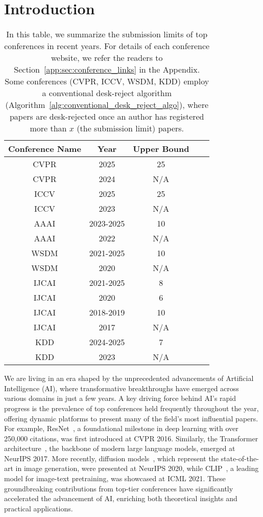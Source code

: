 \section{Introduction}

\begin{table}[!ht]\caption{ 
In this table, we summarize the submission limits of top conferences in recent years. For details of each conference website, we refer the readers to Section~\ref{app:sec:conference_links} in the Appendix. 
Some conferences (CVPR, ICCV, WSDM, KDD) employ a conventional desk-reject algorithm (Algorithm~\ref{alg:conventional_desk_reject_algo}), where papers are desk-rejected once an author has registered more than $x$ (the submission limit) papers.
}  \label{tab:conference_submission_limit}
\begin{center}
\begin{tabular}{ |c|c|c|c|c| } 
 \hline
 {\bf Conference Name} & {\bf Year} & {\bf Upper Bound} \\ \hline
 CVPR & 2025 & 25 \\ \hline
 CVPR & 2024 & N/A \\ \hline
 ICCV & 2025 & 25 \\ \hline
 ICCV & 2023 & N/A \\ \hline
 AAAI & 2023-2025 & 10 \\ \hline
 AAAI & 2022 & N/A \\ \hline
 WSDM & 2021-2025 & 10 \\ \hline
 WSDM & 2020 & N/A \\ \hline
 IJCAI & 2021-2025 & 8 \\ \hline
 IJCAI & 2020 & 6 \\ \hline
 IJCAI & 2018-2019 & 10 \\ \hline
 IJCAI & 2017 & N/A \\ \hline
 KDD & 2024-2025 & 7 \\ \hline
 KDD & 2023 & N/A \\ \hline
\end{tabular}
\end{center}
\end{table}

We are living in an era shaped by the unprecedented advancements of Artificial Intelligence (AI), where transformative breakthroughs have emerged across various domains in just a few years. A key driving force behind AI's rapid progress is the prevalence of top conferences held frequently throughout the year, offering dynamic platforms to present many of the field’s most influential papers. For example, ResNet~\cite{hzrs16}, a foundational milestone in deep learning with over 250,000 citations, was first introduced at CVPR 2016. Similarly, the Transformer architecture~\cite{vsp+17}, the backbone of modern large language models, emerged at NeurIPS 2017. More recently, diffusion models~\cite{hja20}, which represent the state-of-the-art in image generation, were presented at NeurIPS 2020, while CLIP~\cite{rkh+21}, a leading model for image-text pretraining, was showcased at ICML 2021. These groundbreaking contributions from top-tier conferences have significantly accelerated the advancement of AI, enriching both theoretical insights and practical applications.


